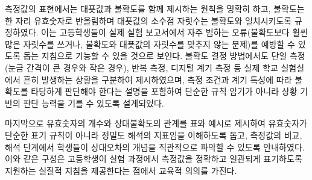 측정값의 표현에서는 대푯값과 불확도를 함께 제시하는 원칙을 명확히 하고,
불확도는 한 자리 유효숫자로 반올림하며 대푯값의 소수점 자릿수는 불확도와 일치시키도록 규정하였다.
이는 고등학생들이 실제 실험 보고서에서 자주 범하는 오류(불확도보다 훨씬 많은 자릿수를 쓰거나,
불확도와 대푯값의 자릿수를 맞추지 않는 문제)를 예방할 수 있도록 돕는 지침으로 기능할 수 있을 것으로 보인다.
%
불확도 결정 방법에서도 단일 측정(눈금 간격이 큰 경우와 작은 경우),
반복 측정, 디지털 계기 측정 등 실제 학교 실험실에서 흔히 발생하는 상황을 구분하여 제시하였으며,
측정 조건과 계기 특성에 따라 불확도를 타당하게 판단해야 한다는 설명을 포함하여
단순한 규칙 암기가 아니라 상황 기반의 판단 능력을 기를 수 있도록 설계되었다.

마지막으로 유효숫자의 개수와 상대불확도의 관계를 표와 예시로 제시하여
유효숫자가 단순한 표기 규칙이 아니라 정밀도 해석의 지표임을 이해하도록 돕고,
측정값의 비교, 해석 단계에서 학생들이 상대오차의 개념을 직관적으로 파악할 수 있도록 안내하였다.
%
이와 같은 구성은 고등학생이 실험 과정에서 측정값을 정확하고 일관되게 표기하도록
지원하는 실질적 지침을 제공한다는 점에서 교육적 의의를 가진다.